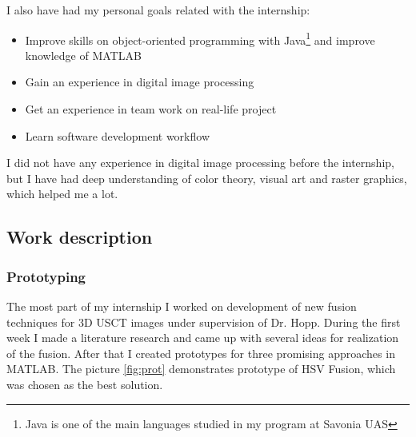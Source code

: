 \documentclass[english]{article}
\begin{document}
I also have had my personal goals related with the internship:
\begin{itemize}
\item Improve skills on object-oriented programming with Java\footnote{Java is one of the main languages studied in my program at Savonia UAS} and improve knowledge of MATLAB
\item Gain an experience in digital image processing
\item Get an experience in team work on real-life project
\item Learn software development workflow
\end{itemize}
I did not have any experience in digital image processing before the internship, but I have had deep understanding of color theory, visual art and raster graphics, which helped me a lot.

\subsection{Work description}
\subsubsection{Prototyping}

The most part of my internship I worked on development of new fusion techniques for 3D USCT images under supervision of Dr. Hopp. During the first week I made a literature research and came up with several ideas for realization of the fusion. After that I created prototypes for three promising approaches in MATLAB. The picture \ref{fig:prot} demonstrates prototype of HSV Fusion, which was chosen as the best solution.\\
\end{document}
